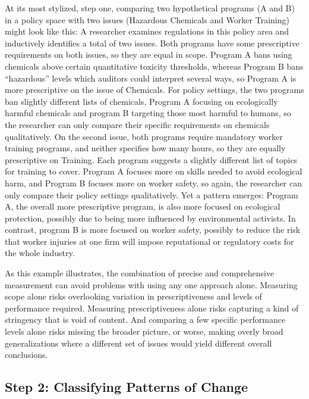 \documentclass[
      12pt,
            Review ]{article}
\begin{document}
At its most stylized, step one, comparing two hypothetical programs (A
and B) in a policy space with two issues (Hazardous Chemicals and Worker
Training) might look like this: A researcher examines regulations in
this policy area and inductively identifies a total of two issues. Both
programs have some prescriptive requirements on both issues, so they are
equal in scope. Program A bans using chemicals above certain
quantitative toxicity thresholds, whereas Program B bans ``hazardous''
levels which auditors could interpret several ways, so Program A is more
prescriptive on the issue of Chemicals. For policy settings, the two
programs ban slightly different lists of chemicals, Program A focusing
on ecologically harmful chemicals and program B targeting those most
harmful to humans, so the researcher can only compare their specific
requirements on chemicals qualitatively. On the second issue, both
programs require mandatory worker training programs, and neither
specifies how many hours, so they are equally prescriptive on Training.
Each program suggests a slightly different list of topics for training
to cover. Program A focuses more on skills needed to avoid ecological
harm, and Program B focuses more on worker safety, so again, the
researcher can only compare their policy settings qualitatively. Yet a
pattern emerges: Program A, the overall more prescriptive program, is
also more focused on ecological protection, possibly due to being more
influenced by environmental activists. In contrast, program B is more
focused on worker safety, possibly to reduce the risk that worker
injuries at one firm will impose reputational or regulatory costs for
the whole industry.

As this example illustrates, the combination of precise and
comprehensive measurement can avoid problems with using any one approach
alone. Measuring scope alone risks overlooking variation in
prescriptiveness and levels of performance required. Measuring
prescriptiveness alone risks capturing a kind of stringency that is void
of content. And comparing a few specific performance levels alone risks
missing the broader picture, or worse, making overly broad
generalizations where a different set of issues would yield different
overall conclusions.

\subsection{Step 2: Classifying Patterns of
Change}\label{step-2-classifying-patterns-of-change}
\end{document}
